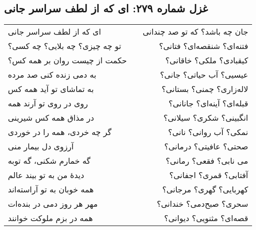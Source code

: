 \begin{center}
\section*{غزل شماره ۲۷۹: ای که از لطف سراسر جانی}
\label{sec:279}
\begin{longtable}{l p{0.5cm} r}
ای که از لطف سراسر جانی
&&
جان چه باشد؟ که تو صد چندانی
\\
تو چه چیزی؟ چه بلایی؟ چه کسی؟
&&
فتنه‌ای؟ شنقصه‌ای؟ فتانی؟
\\
حکمت از چیست روان بر همه کس؟
&&
کیقبادی؟ ملکی؟ خاقانی؟
\\
به دمی زنده کنی صد مرده
&&
عیسیی؟ آب حیاتی؟ جانی؟
\\
به تماشای تو آید همه کس
&&
لاله‌زاری؟ چمنی؟ بستانی؟
\\
روی در روی تو آرند همه
&&
قبله‌ای؟ آینه‌ای؟ جانانی؟
\\
در مذاق همه کس شیرینی
&&
انگبینی؟ شکری؟ سیلانی؟
\\
گر چه خردی، همه را در خوردی
&&
نمکی؟ آب روانی؟ نانی؟
\\
آرزوی دل بیمار منی
&&
صحتی؟ عافیتی؟ درمانی؟
\\
گه خمارم شکنی، گه توبه
&&
می نابی؟ فقعی؟ رمانی؟
\\
دیدهٔ من به تو بیند عالم
&&
آفتابی؟ قمری؟ اجفانی؟
\\
همه خوبان به تو آراسته‌اند
&&
کهربایی؟ گهری؟ مرجانی؟
\\
مهر هر روز دمی در بنده‌ات
&&
سحری؟ صبح‌دمی؟ خندانی؟
\\
همه در بزم ملوکت خوانند
&&
قصه‌ای؟ مثنویی؟ دیوانی؟
\\
\end{longtable}
\end{center}
